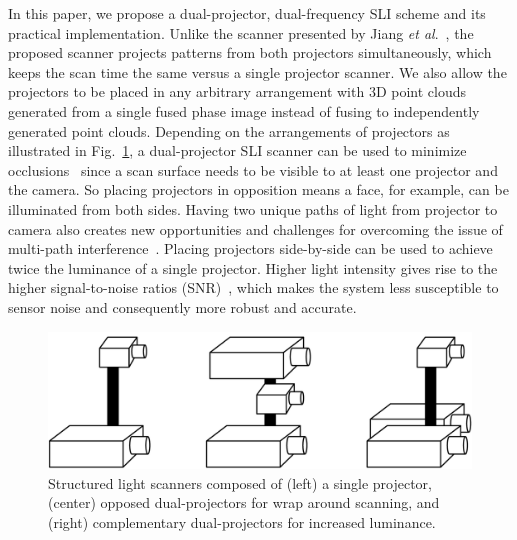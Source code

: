 \documentclass[]{spie}  %
\begin{document}
In this paper, we propose a dual-projector, dual-frequency SLI scheme and its practical implementation. Unlike the scanner presented by Jiang \textit{et al}.~\cite{jian18}, the proposed scanner projects patterns from both projectors simultaneously, which keeps the scan time the same versus a single projector scanner.  We also allow the projectors to be placed in any arbitrary arrangement with 3D point clouds generated from a single fused phase image instead of fusing to independently generated point clouds. Depending on the arrangements of projectors as illustrated in Fig.~\ref{Fig:10}, a dual-projector SLI scanner can be used to minimize occlusions~\cite{linj13} since a scan surface needs to be visible to at least one projector and the camera.  So placing projectors in opposition means a face, for example, can be illuminated from both sides.  Having two unique paths of light from projector to camera also creates new opportunities and challenges for overcoming the issue of multi-path interference~\cite{otoo16}. Placing projectors side-by-side can be used to achieve twice the luminance of a single projector. Higher light intensity gives rise to the higher signal-to-noise ratios (SNR)~\cite{wangy10}, which makes the system less susceptible to sensor noise and consequently more robust and accurate.

\begin{figure}
\centerline{\includegraphics[width=5.0in]{Figures/Layouts}}
\vspace{0.1in}
\caption{Structured light scanners composed of (left) a single projector, (center) opposed dual-projectors for wrap around scanning, and (right) complementary dual-projectors for increased luminance.}
\label{Fig:10}
\end{figure} 
\end{document}
